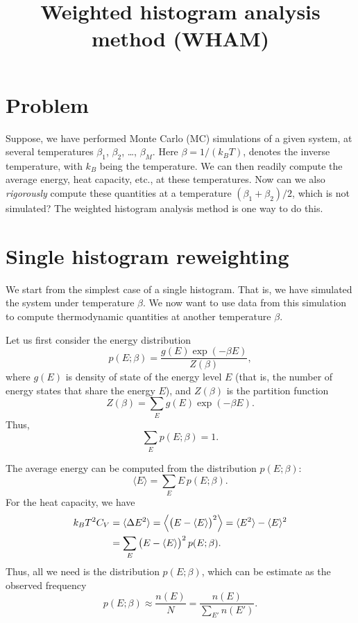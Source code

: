 \documentclass[12pt]{article}
\begin{document}
\title{Weighted histogram analysis method (WHAM)}
\date{}
\maketitle

\section{Problem}

Suppose, we have performed Monte Carlo (MC) simulations of a given system,
 at several temperatures $\beta_1$, $\beta_2$, \dots, $\beta_M$.
%
Here $\beta = 1/(k_B T)$, denotes the inverse temperature,
with $k_B$ being the temperature.
%
We can then readily compute the average energy, heat capacity, etc.,
at these temperatures.
%
Now can we also \emph{rigorously} compute these quantities at a temperature
$(\beta_1 + \beta_2)/2$, which is not simulated?
%
The weighted histogram analysis method is one way to do this.



\section{Single histogram reweighting}

We start from the simplest case of a single histogram.
%
That is, we have simulated the system under temperature $\beta$.
%
We now want to use data from this simulation to compute thermodynamic quantities
at another temperature $\beta$.


Let us first consider the energy distribution
\begin{equation}
  p(E; \beta) = \frac{ g(E) \exp(-\beta E) } { Z(\beta) },
  \label{eq:pE}
\end{equation}
where
$g(E)$ is density of state of the energy level $E$
(that is, the number of energy states that share the energy $E$),
and $Z(\beta)$ is the partition function
\begin{equation}
  Z(\beta) = \sum_E g(E) \exp(-\beta E).
\end{equation}
Thus,
\begin{equation}
  \sum_E p(E; \beta) = 1.
\end{equation}


The average energy can be computed from the distribution $p(E; \beta)$:
\begin{equation}
  \langle E \rangle
= \sum_E E \, p(E; \beta).
\label{eq:avE}
\end{equation}
%
For the heat capacity, we have
\begin{align}
  k_B T^2 C_V
&=
  \langle \Delta E^2 \rangle
=
  \Big\langle\big( E - \langle E \rangle\big)^2\Big\rangle
=
  \langle E^2 \rangle - \langle E \rangle^2
 \notag \\
&=
  \sum_E \big( E - \langle E \rangle\big)^2 \, p(E; \beta).
\label{eq:CV}
\end{align}
Thus, all we need is the distribution $p(E; \beta)$,
which can be estimate as the observed frequency
\begin{equation}
  p(E; \beta)
\approx
\frac{ n(E) } { N }
=
\frac{ n(E) } { \sum_{E'} n(E') }.
\label{eq:pEfreq}
\end{equation}
\end{document}
